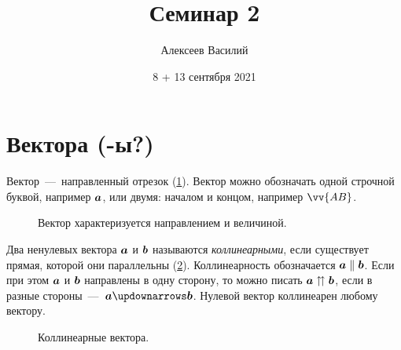 \documentclass[a4paper,12pt]{article}
\author{Алексеев Василий}
\title{Семинар 2}
\date{8 + 13 сентября 2021}
\begin{document}
  \maketitle
  
  \tableofcontents

  \thispagestyle{empty}
  
  \newpage
  


  \section{Вектора (-ы?)}
  
  Вектор~---~направленный отрезок (\ref{fig:vector}).
  Вектор можно обозначать одной строчной буквой, например $\boldsymbol a$, или двумя: началом и концом, например $\vv{AB}$.
  
  \begin{figure}[h]
    \centering
    
    
    \caption{Вектор характеризуется направлением и величиной.}
    \label{fig:vector}
  \end{figure}
  
  \begin{definition}[Коллинеарность]
    Два ненулевых вектора $\boldsymbol a$ и $\boldsymbol b$ называются \emph{коллинеарными}, если существует прямая, которой они параллельны (\ref{fig:collinearity}).
    Коллинеарность обозначается $\bds a \hm\parallel \bds b$.
    Если при этом $\boldsymbol a$ и $\boldsymbol b$ направлены в одну сторону, то можно писать $\bds a \hm\upuparrows \bds b$,
    если в разные стороны~---~$\bds a \hm\updownarrows \bds b$.
    Нулевой вектор коллинеарен любому вектору.
  \end{definition}
  
  \begin{figure}[h]
    \centering
    
    
    \caption{Коллинеарные вектора.}
    \label{fig:collinearity}
  \end{figure}
  
\end{document}
